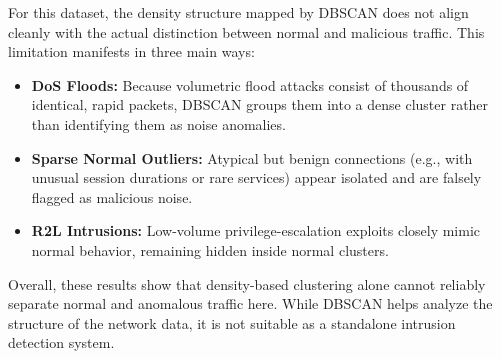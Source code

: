     \vspace{-0.3cm}


    \noindent
    For this dataset, the density structure mapped by DBSCAN does not align cleanly with the actual distinction between normal and malicious traffic. 
    This limitation manifests in three main ways:
    \begin{itemize}
        \item \textbf{DoS Floods:} Because volumetric flood attacks consist of thousands of identical, rapid packets, DBSCAN groups them into a dense cluster rather than identifying them as noise anomalies.
        \item \textbf{Sparse Normal Outliers:} Atypical but benign connections (e.g., with unusual session durations or rare services) appear isolated and are falsely flagged as malicious noise.
        \item \textbf{R2L Intrusions:} Low-volume privilege-escalation exploits closely mimic normal behavior, remaining hidden inside normal clusters.
    \end{itemize}

    \noindent
    Overall, these results show that density-based clustering alone cannot reliably separate normal and anomalous traffic here. 
    While DBSCAN helps analyze the structure of the network data, it is not suitable as a standalone intrusion detection system.
